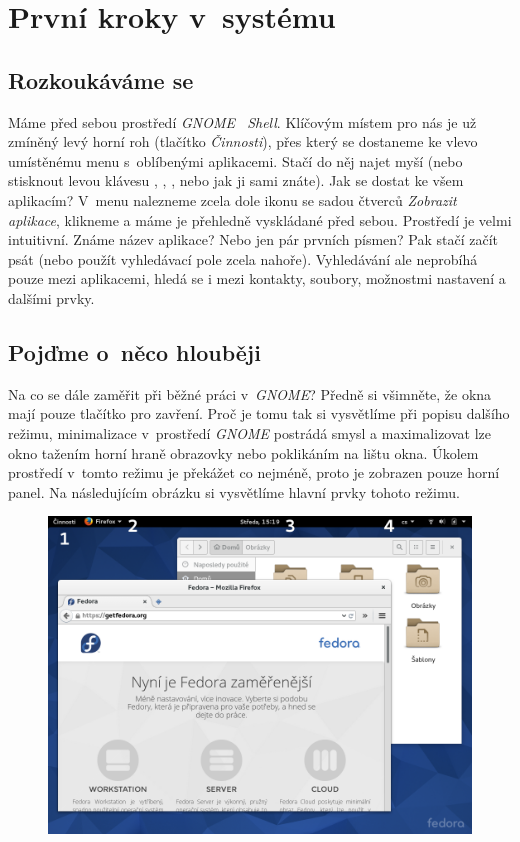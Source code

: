 \chapter*{První kroky v~systému}
\section*{Rozkoukáváme se}
Máme před sebou prostředí \emph{GNOME~ Shell}. Klíčovým místem pro nás je už zmíněný levý horní roh (tlačítko \emph{Činnosti}), přes který se dostaneme ke vlevo umístěnému menu s~oblíbenými aplikacemi. Stačí do něj najet myší (nebo stisknout levou klávesu , , , nebo jak ji sami znáte). Jak se dostat ke všem aplikacím? V~menu nalezneme zcela dole ikonu se sadou čtverců \emph{Zobrazit aplikace}, klikneme a máme je přehledně vyskládané před sebou. Prostředí je velmi intuitivní. Známe název aplikace? Nebo jen pár prvních písmen? Pak stačí začít psát (nebo použít vyhledávací pole zcela nahoře). Vyhledávání ale neprobíhá pouze mezi aplikacemi, hledá se i mezi kontakty, soubory, možnostmi nastavení a dalšími prvky.

\section*{Pojďme o~něco hlouběji}
Na co se dále zaměřit při běžné práci v~\emph{GNOME}? Předně si všimněte, že okna mají pouze tlačítko pro zavření. Proč je tomu tak si vysvětlíme při popisu dalšího režimu, minimalizace v~prostředí \emph{GNOME} postrádá smysl a maximalizovat lze okno tažením horní hraně obrazovky nebo poklikáním na lištu okna. Úkolem prostředí v~tomto režimu je překážet co nejméně, proto je zobrazen pouze horní panel. Na následujícím obrázku si vysvětlíme hlavní prvky tohoto režimu.

\begin{figure}[t]
\begin{center}
\includegraphics[width=\textwidth]{img/shell-a}
 \label{fig:shell-a}
\end{center}
\end{figure}

